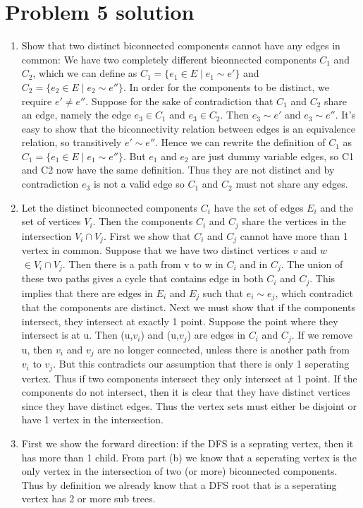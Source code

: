\documentclass[11pt]{article}
\newenvironment{qparts}{\begin{enumerate}[{(}a{)}]}{\end{enumerate}}
\begin{document}
\section*{Problem 5 solution}
\begin{qparts}
\item Show that two distinct biconnected components cannot have any edges in common: We have two completely different biconnected components $C_1$ and $C_2$, which we can define as $C_1 = \{e_1 \in E \mid e_1 \sim e'\}$ and $C_2 = \{e_2 \in E \mid e_2 \sim e''\}$. In order for the components to be distinct, we require $e' \neq e''$. Suppose for the sake of contradiction that $C_1$ and $C_2$ share an edge, namely the edge $e_3 \in C_1$ and $e_3 \in C_2$. Then $e_3 \sim e'$ and $e_3 \sim e''$. It's easy to show that the biconnectivity relation between edges is an equivalence relation, so transitively $e' \sim e''$. Hence we can rewrite the definition of $C_1$ as $C_1 = \{e_1 \in E \mid e_1 \sim e''\}$. But $e_1$ and $e_2$ are just dummy variable edges, so C1 and C2 now have the same definition. Thus they are not distinct and by contradiction $e_3$ is not a valid edge so $C_1$ and $C_2$ must not share any edges.
\item Let the distinct biconnected components $C_i$ have the set of edges $E_i$ and the set of vertices $V_i$. Then the components $C_i$ and $C_j$ share the vertices in the intersection $V_i \cap V_j$. First we show that $C_i$ and $C_j$ cannot have more than 1 vertex in common. Suppose that we have two distinct vertices $v$ and $w$ $\in V_i \cap V_j$. Then there is a path from v to w in $C_i$ and in $C_j$. The union of these two paths gives a cycle that contains edge in both $C_i$ and $C_j$. This implies that there are edges in $E_i$ and $E_j$ such that $e_i \sim e_j$, which contradict that the components are distinct.
Next we must show that if the components intersect, they intersect at exactly 1 point. Suppose the point where they intersect is at u. Then (u,$v_i$) and (u,$v_j$) are edges in $C_i$ and $C_j$. If we remove u, then $v_i$ and $v_j$ are no longer connected, unless there is another path from $v_i$ to $v_j$. But this contradicts our assumption that there is only 1 seperating vertex. Thus if two components intersect they only intersect at 1 point.
If the components do not intersect, then it is clear that they have distinct vertices since they have distinct edges. Thus the vertex sets must either be disjoint or have 1 vertex in the intersection.
\item First we show the forward direction: if the DFS is a seprating vertex, then it has more than 1 child. From part (b) we know that a seperating vertex is the only vertex in the intersection of two (or more) biconnected components. Thus by definition we already know that a DFS root that is a seperating vertex has 2 or more sub trees. \newline

\end{qparts}
\end{document}
